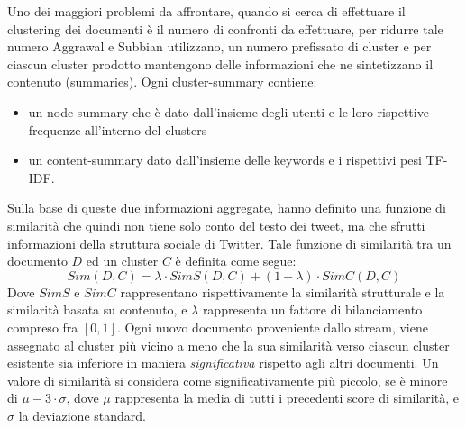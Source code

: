 Uno dei maggiori problemi da affrontare, quando si cerca di effettuare il clustering dei documenti è il numero di confronti da effettuare, per ridurre tale numero Aggrawal e Subbian \cite{doi:10.1137/1.9781611972825.54} utilizzano, un numero prefissato di cluster e per ciascun cluster prodotto mantengono delle informazioni che ne sintetizzano il contenuto (summaries). Ogni cluster-summary contiene: 
\begin{itemize}
\item un node-summary che è dato dall'insieme degli utenti e le  loro rispettive frequenze all'interno del clusters
\item un content-summary dato dall'insieme delle keywords e i rispettivi pesi TF-IDF.
\end{itemize} 
Sulla base di queste due informazioni aggregate, hanno definito una funzione di similarità che quindi non tiene solo conto del testo dei tweet, ma che sfrutti informazioni della struttura sociale di Twitter.
Tale funzione di similarità tra un documento $D$ ed un cluster $C$ è definita come segue:
\begin{equation}
\label{eq:aggrawalSim}
Sim(D,C)=\lambda\cdot SimS(D,C)+(1-\lambda)\cdot SimC(D,C)
\end{equation}
Dove $SimS$ e $SimC$ rappresentano rispettivamente la similarità strutturale e la similarità basata su contenuto, e $\lambda$ rappresenta un fattore di bilanciamento compreso fra $[0,1]$.
Ogni nuovo documento proveniente dallo stream, viene assegnato al cluster più vicino a meno che la sua similarità verso ciascun cluster esistente sia inferiore in maniera \emph	{significativa} rispetto agli altri documenti.  Un valore di similarità si considera come significativamente più piccolo, se è minore di $\mu-3 \cdot \sigma$, dove $\mu$ rappresenta la media di tutti i precedenti score di similarità, e $\sigma$ la deviazione standard.


